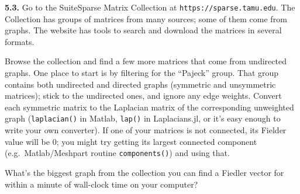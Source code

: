 \documentclass[11pt]{article}
\begin{document}
\par\bigskip
{\bf 5.3.} 
Go to the SuiteSparse Matrix Collection at {\tt https://sparse.tamu.edu}.
The Collection has groups of matrices from many sources;
some of them come from graphs.
The website has tools to search and download the matrices in several formats.

Browse the collection and find a few more matrices 
that come from undirected graphs. 
One place to start is by filtering for the ``Pajeck'' group.
That group contains both undirected and directed graphs 
(symmetric and unsymmetric matrices); stick to the undirected ones,
and ignore any edge weights. 
Convert each symmetric matrix to the Laplacian matrix of the 
corresponding unweighted graph
({\tt laplacian()} in Matlab, {\tt lap()} in Laplacians.jl,
or it's easy enough to write your own converter).
If one of your matrices is not connected, its Fielder value will be 0;
you might try getting its largest connected component 
(e.g.\ Matlab/Meshpart routine {\tt components()}) and using that.

What's the biggest graph from the collection you can find a Fiedler vector 
for within a minute of wall-clock time on your computer?
\end{document}
